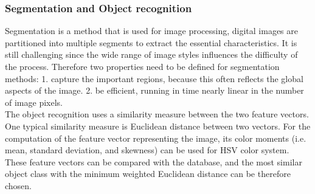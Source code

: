 \subsubsection{Segmentation and Object recognition}


Segmentation \cite{pedro} is a method that is used for image processing, digital images are partitioned into multiple segments to extract the essential characteristics. It is still challenging since the wide range of image styles influences the difficulty of the process. Therefore two properties need to be defined for segmentation methods: 1. capture the important regions, because this often reflects the global aspects of the image. 2. be efficient, running in time nearly linear in the number of image pixels.\\ %



The object recognition uses a similarity measure between the two feature vectors. One typical similarity measure is Euclidean distance between two vectors. For the computation of the feature vector representing the image, its color moments (i.e. mean, standard deviation, and skewness) can be used for HSV color system. These feature vectors can be compared with the database, and the most similar object class with the minimum weighted Euclidean distance can be therefore chosen.

